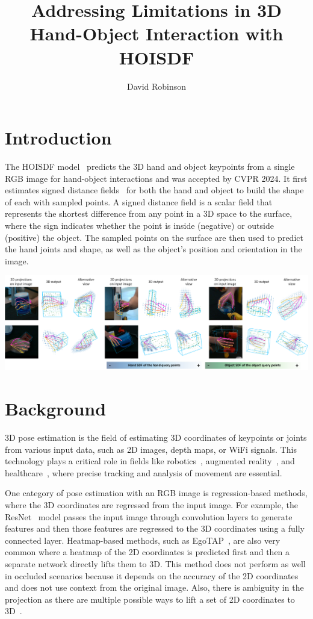 \documentclass{article}
\title{Addressing Limitations in 3D Hand-Object Interaction with HOISDF}
\author{David Robinson}
\date{}
\begin{document}
\maketitle

\section*{Introduction}

The HOISDF model~\cite{qi2024hoisdf} predicts the 3D hand and object keypoints from a single RGB image for hand-object interactions and was accepted by CVPR 2024. It first estimates signed distance fields~\cite{ma2021neuralpull} for both the hand and object to build the shape of each with sampled points. A signed distance field is a scalar field that represents the shortest difference from any point in a 3D space to the surface, where the sign indicates whether the point is inside (negative) or outside (positive) the object. The sampled points on the surface are then used to predict the hand joints and shape, as well as the object's position and orientation in the image.

\begin{center}
    \includegraphics[scale=0.25]{hoisdf-1.png}
\end{center}

\section*{Background}

3D pose estimation is the field of estimating 3D coordinates of keypoints or joints from various input data, such as 2D images, depth maps, or WiFi signals. This technology plays a critical role in fields like robotics~\cite{billard2019robotics}, augmented reality~\cite{chen2019augmentedreality}, and healthcare~\cite{stenum2021health}, where precise tracking and analysis of movement are essential.

One category of pose estimation with an RGB image is regression-based methods, where the 3D coordinates are regressed from the input image. For example, the ResNet~\cite{he2016resnet} model passes the input image through convolution layers to generate features and then those features are regressed to the 3D coordinates using a fully connected layer. Heatmap-based methods, such as EgoTAP~\cite{kang2024egotap}, are also very common where a heatmap of the 2D coordinates is predicted first and then a separate network directly lifts them to 3D. This method does not perform as well in occluded scenarios because it depends on the accuracy of the 2D coordinates and does not use context from the original image. Also, there is ambiguity in the projection as there are multiple possible ways to lift a set of 2D coordinates to 3D~\cite{zhou2024lifting}.
\end{document}
